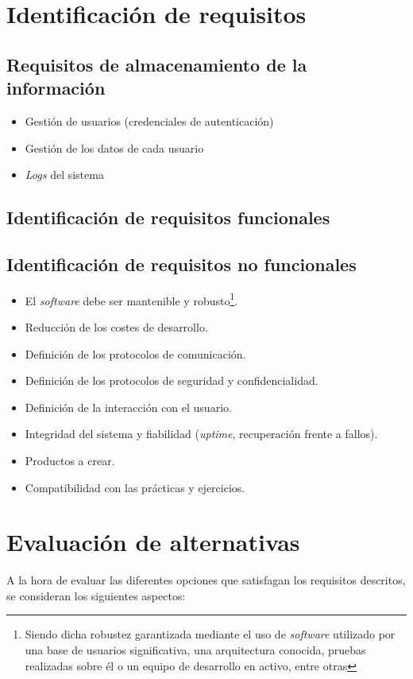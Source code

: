 \section{Identificación de requisitos}

\subsection{Requisitos de almacenamiento de la información}

\begin{itemize}
  \item Gestión de usuarios (credenciales de autenticación)
  \item Gestión de los datos de cada usuario
  \item \textit{Logs} del sistema
\end{itemize}

\subsection{Identificación de requisitos funcionales}


\subsection{Identificación de requisitos no funcionales}

\begin{itemize}
  \item El \textit{software} debe ser mantenible y robusto\footnote{Siendo dicha robustez garantizada mediante el uso de \textit{software} utilizado por una base de usuarios significativa, una arquitectura conocida, pruebas realizadas sobre él o un equipo de desarrollo en activo, entre otras}.
  \item Reducción de los costes de desarrollo.
  \item Definición de los protocolos de comunicación.
  \item Definición de los protocolos de seguridad y confidencialidad.
  \item Definición de la interacción con el usuario.
  \item Integridad del sistema y fiabilidad (\textit{uptime}, recuperación frente a fallos).
  \item Productos a crear.
  \item Compatibilidad con las prácticas y ejercicios.
\end{itemize}

\section{Evaluación de alternativas}
\label{alternativas}
A la hora de evaluar las diferentes opciones que satisfagan los requisitos descritos, se consideran los siguientes aspectos:

